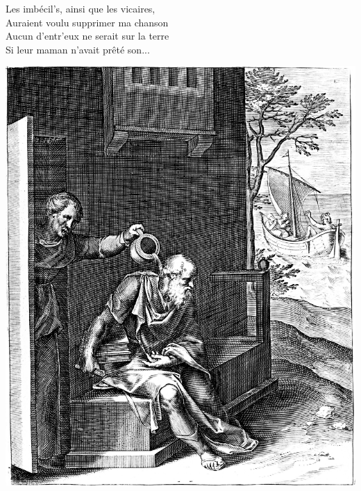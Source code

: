 \breakpage
Les imbécil's, ainsi que les vicaires,
\\Auraient voulu supprimer ma chanson
\\Aucun d'entr'eux ne serait sur la terre
\\Si leur maman n'avait prêté son...

\bigskip
\bigskip
\begin{center}
\includegraphics[width=1\textwidth]{images/brev44.png}
\end{center}

\breakpage